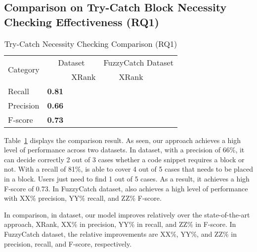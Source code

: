 \subsection{Comparison on Try-Catch Block Necessity Checking Effectiveness (RQ1)}
\label{sec:rq1}

\begin{table}[htpb]
  \caption{Try-Catch Necessity Checking Comparison (RQ1)}
  \vspace{-12pt}
	\begin{center}
		\renewcommand{\arraystretch}{1}
		\begin{tabular}{p{1.5cm}<{\centering}|p{1.25cm}<{\centering}p{1.25cm}<{\centering}|p{1.25cm}<{\centering}p{1.25cm}<{\centering}}
			\hline
			\multirow{2}{*}{Category} & \multicolumn{2}{c|}{{\tool} Dataset} & \multicolumn{2}{c}{FuzzyCatch Dataset}\\
			\cline{2-5}
			  & \tool  & XRank & \tool  & XRank\\
			\hline
			Recall    & \textbf{0.81} & &&\\
			Precision & \textbf{0.66} & &&\\
			F-score   & \textbf{0.73} & &&\\
			\hline
		\end{tabular}
		\label{tab:xblock}
	\end{center}
\end{table}


Table~\ref{tab:xblock} displays the comparison result. As seen, our
approach achieves a high level of performance across two datasets. In
{\tool} dataset, with a precision of 66\%, it can decide correctly 2
out of 3 cases whether a code snippet requires a 
block or not. With a recall of 81\%, {\tool} is able to cover 4 out of
5 cases that needs to be placed in a  block. Users
just need to find 1 out of 5 cases. As a result, it achieves a high
F-score of 0.73. In FuzzyCatch dataset, {\tool} also achieves a high
level of performance with XX\% precision, YY\% recall, and ZZ\%
F-score.

In comparison, in {\tool} dataset, our model improves relatively over
the state-of-the-art approach, XRank, XX\% in precision, YY\% in
recall, and ZZ\% in F-score. In FuzzyCatch dataset, the relative
improvements are XX\%, YY\%, and ZZ\% in precision, recall, and
F-score, respectively.

